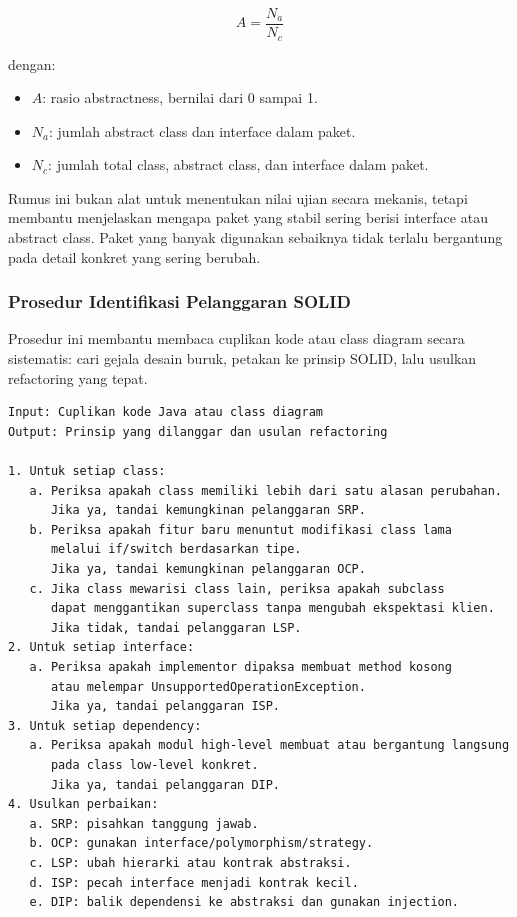 \begin{equation}
    A = \frac{N_a}{N_c}
    \label{eq:abstractness}
\end{equation}

dengan:
\begin{itemize}
    \item $A$: rasio abstractness, bernilai dari 0 sampai 1.
    \item $N_a$: jumlah abstract class dan interface dalam paket.
    \item $N_c$: jumlah total class, abstract class, dan interface dalam paket.
\end{itemize}

Rumus ini bukan alat untuk menentukan nilai ujian secara mekanis, tetapi membantu menjelaskan mengapa paket yang stabil sering berisi interface atau abstract class. Paket yang banyak digunakan sebaiknya tidak terlalu bergantung pada detail konkret yang sering berubah.

\subsubsection{Prosedur Identifikasi Pelanggaran SOLID}

\begin{jawab}
Prosedur ini membantu membaca cuplikan kode atau class diagram secara sistematis: cari gejala desain buruk, petakan ke prinsip SOLID, lalu usulkan refactoring yang tepat.
\end{jawab}

\begin{lstlisting}[caption={Pseudocode identifikasi pelanggaran SOLID}, label={lst:solid-diagnosis}]
Input: Cuplikan kode Java atau class diagram
Output: Prinsip yang dilanggar dan usulan refactoring

1. Untuk setiap class:
   a. Periksa apakah class memiliki lebih dari satu alasan perubahan.
      Jika ya, tandai kemungkinan pelanggaran SRP.
   b. Periksa apakah fitur baru menuntut modifikasi class lama
      melalui if/switch berdasarkan tipe.
      Jika ya, tandai kemungkinan pelanggaran OCP.
   c. Jika class mewarisi class lain, periksa apakah subclass
      dapat menggantikan superclass tanpa mengubah ekspektasi klien.
      Jika tidak, tandai pelanggaran LSP.
2. Untuk setiap interface:
   a. Periksa apakah implementor dipaksa membuat method kosong
      atau melempar UnsupportedOperationException.
      Jika ya, tandai pelanggaran ISP.
3. Untuk setiap dependency:
   a. Periksa apakah modul high-level membuat atau bergantung langsung
      pada class low-level konkret.
      Jika ya, tandai pelanggaran DIP.
4. Usulkan perbaikan:
   a. SRP: pisahkan tanggung jawab.
   b. OCP: gunakan interface/polymorphism/strategy.
   c. LSP: ubah hierarki atau kontrak abstraksi.
   d. ISP: pecah interface menjadi kontrak kecil.
   e. DIP: balik dependensi ke abstraksi dan gunakan injection.
\end{lstlisting}

